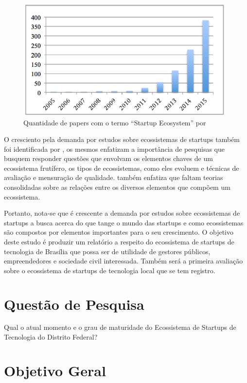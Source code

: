 \begin{figure}[!htb]
	\centering
	\includegraphics[width=11cm,angle=0]{figuras/papers_about_startup_ecosystems}
	\caption{Quantidade de papers com o termo ``Startup Ecosystem'' por }
	\label{figure:papers_about_startup_ecosystems}
\end{figure}

O cresciento pela demanda por estudos sobre ecossistemas de startups também foi identificada por , os mesmos enfatizam a importância de pesquisas que busquem responder questões que envolvam os elementos chaves de um ecossistema frutífero, os tipos de ecossistemas, como eles evoluem e técnicas de avaliação e mensuração de qualidade.  também enfatiza que faltam teorias consolidadas sobre as relações entre os diversos elementos que compõem um ecossistema.

Portanto, nota-se que é crescente a demanda por estudos sobre ecossistemas de startups a busca acerca do que tange o mundo das startups e como ecossistemas são compostos por elementos importantes para o seu crescimento. O objetivo deste estudo é produzir um relatório a respeito do ecossistema de startups de tecnologia de Brasília que possa ser de utilidade de gestores públicos, empreendedores e sociedade civil interessada. Também será a primeira avaliação sobre o ecossistema de startups de tecnologia local que se tem registro.

\section{Questão de Pesquisa}
\label{section:questao_de_pesquisa}

Qual o atual momento e o grau de maturidade do Ecossistema de Startups de Tecnologia do Distrito Federal?

\section{Objetivo Geral}
\label{section:objetivo_geral}

